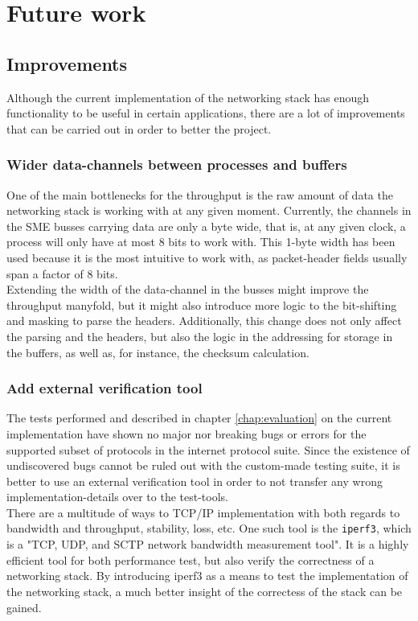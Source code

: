 \chapter{Future work}
\label{chap:future_work}

\section{Improvements}
Although the current implementation of the networking stack has enough
functionality to be useful in certain applications, there are a lot of
improvements that can be carried out in order to better the project.


\subsection{Wider data-channels between processes and buffers}
One of the main bottlenecks for the throughput is the raw amount of data the
networking stack is working with at any given moment. Currently, the channels in
the SME busses carrying data are only a byte wide, that is, at any given clock,
a process will only have at most 8 bits to work with.
This 1-byte width has been used because it is the most intuitive to work with,
as packet-header fields usually span a factor of 8 bits.\\
Extending the width of the data-channel in the busses might improve the
throughput manyfold, but it might also introduce more logic to the bit-shifting
and masking to parse the headers. Additionally, this change does not only affect
the parsing and the headers, but also the logic in the addressing for storage
in the buffers, as well as, for instance, the checksum calculation.

\subsection{Add external verification tool}
The tests performed and described in chapter \ref{chap:evaluation} on the
current implementation have shown no major nor breaking bugs or errors for
the supported subset of protocols in the internet protocol suite.
Since the existence of undiscovered bugs cannot be ruled out with the
custom-made testing suite, it is better to use an external verification tool in
order to not transfer any wrong implementation-details over to the
test-tools.\\
There are a multitude of ways to TCP/IP implementation with both regards to
bandwidth and throughput, stability, loss, etc.
One such tool is the \texttt{iperf3}, which is a "TCP, UDP, and SCTP network
bandwidth measurement tool"\cite{iperf3}. It is a highly efficient tool for
both performance test, but also verify the correctness of a networking stack.
By introducing iperf3 as a means to test the implementation of the networking
stack, a much better insight of the correctess of the stack can be gained.




